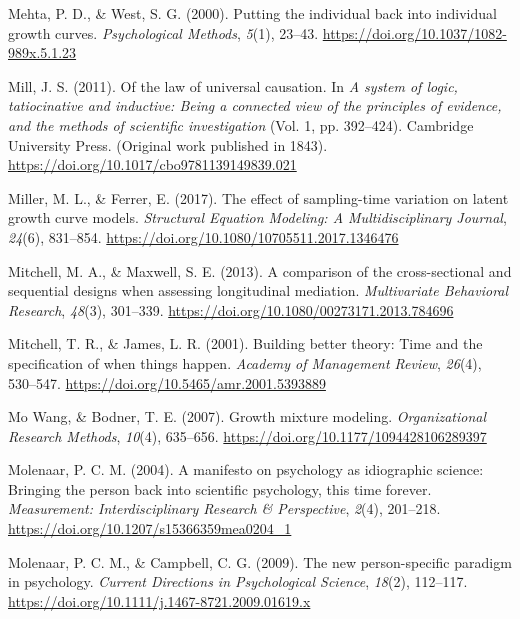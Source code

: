 \documentclass[
  english,
  man,floatsintext]{apa7}
\newlength{\cslhangindent}
\newlength{\cslentryspacingunit} %
\newenvironment{CSLReferences}[2] %
 {%
  \setlength{\parindent}{0pt}
  \ifodd #1
  \let\oldpar\par
  \def\par{\hangindent=\cslhangindent\oldpar}
  \fi
  \setlength{\parskip}{#2\cslentryspacingunit}
 }%
 {}
\begin{document}
\begin{CSLReferences}{1}{0}
\leavevmode{}%
Mehta, P. D., \& West, S. G. (2000). Putting the individual back into individual growth curves. \emph{Psychological Methods}, \emph{5}(1), 23--43. \url{https://doi.org/10.1037/1082-989x.5.1.23}

\leavevmode{}%
Mill, J. S. (2011). Of the law of universal causation. In \emph{A system of logic, tatiocinative and inductive: Being a connected view of the principles of evidence, and the methods of scientific investigation} (Vol. 1, pp. 392--424). Cambridge University Press. (Original work published in 1843). \url{https://doi.org/10.1017/cbo9781139149839.021}

\leavevmode{}%
Miller, M. L., \& Ferrer, E. (2017). The effect of sampling-time variation on latent growth curve models. \emph{Structural Equation Modeling: A Multidisciplinary Journal}, \emph{24}(6), 831--854. \url{https://doi.org/10.1080/10705511.2017.1346476}

\leavevmode{}%
Mitchell, M. A., \& Maxwell, S. E. (2013). A comparison of the cross-sectional and sequential designs when assessing longitudinal mediation. \emph{Multivariate Behavioral Research}, \emph{48}(3), 301--339. \url{https://doi.org/10.1080/00273171.2013.784696}

\leavevmode{}%
Mitchell, T. R., \& James, L. R. (2001). Building better theory: Time and the specification of when things happen. \emph{Academy of Management Review}, \emph{26}(4), 530--547. \url{https://doi.org/10.5465/amr.2001.5393889}

\leavevmode{}%
Mo Wang, \& Bodner, T. E. (2007). Growth mixture modeling. \emph{Organizational Research Methods}, \emph{10}(4), 635--656. \url{https://doi.org/10.1177/1094428106289397}

\leavevmode{}%
Molenaar, P. C. M. (2004). A manifesto on psychology as idiographic science: Bringing the person back into scientific psychology, this time forever. \emph{Measurement: Interdisciplinary Research \& Perspective}, \emph{2}(4), 201--218. \url{https://doi.org/10.1207/s15366359mea0204_1}

\leavevmode{}%
Molenaar, P. C. M., \& Campbell, C. G. (2009). The new person-specific paradigm in psychology. \emph{Current Directions in Psychological Science}, \emph{18}(2), 112--117. \url{https://doi.org/10.1111/j.1467-8721.2009.01619.x}


\end{CSLReferences}
\end{document}
